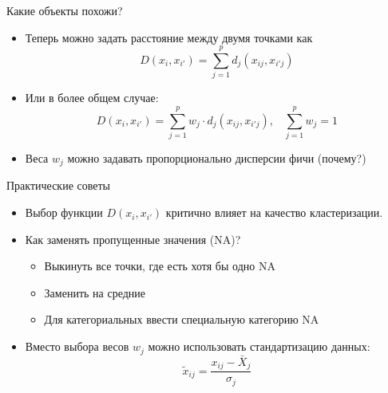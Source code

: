 \documentclass[9pt]{beamer}
\begin{document}
\begin{frame}{Какие объекты похожи?}
\begin{itemize}
    \item Теперь можно задать расстояние между двумя точками как $$D(x_i, x_{i'}) = \sum\limits_{j=1}^p d_j(x_{ij}, x_{i'j})$$
    \item Или в более общем случае:
    $$D(x_i, x_{i'}) = \sum\limits_{j=1}^p w_j \cdot d_j(x_{ij}, x_{i'j}), \;\;\; \sum\limits_{j=1}^p w_j=1$$
    \item Веса $w_j$ можно задавать пропорционально дисперсии фичи (почему?)
\end{itemize}
\end{frame}

\begin{frame}{Практические советы}
\begin{itemize}
    \item Выбор функции $D(x_i, x_{i'})$ критично влияет на качество кластеризации.
    \item Как заменять пропущенные значения (NA)?
    \begin{itemize}
        \item Выкинуть все точки, где есть хотя бы одно NA
        \item Заменить на средние
        \item Для категориальных ввести специальную категорию NA
    \end{itemize}
    \item Вместо выбора весов $w_j$ можно использовать стандартизацию данных:
    $$\tilde x_{ij} = \frac{x_{ij} - \bar X_j}{\sigma_j}$$
\end{itemize}
\end{frame}
\end{document}
